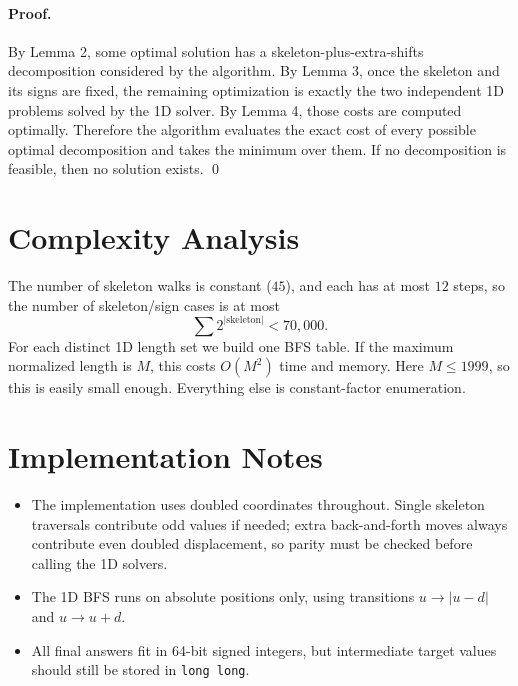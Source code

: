 \documentclass[11pt]{article}
\begin{document}
\paragraph{Proof.}
By Lemma 2, some optimal solution has a skeleton-plus-extra-shifts decomposition considered by the algorithm. By Lemma 3, once the skeleton and its signs are fixed, the remaining optimization is exactly the two independent 1D problems solved by the 1D solver. By Lemma 4, those costs are computed optimally. Therefore the algorithm evaluates the exact cost of every possible optimal decomposition and takes the minimum over them. If no decomposition is feasible, then no solution exists. \qed

\section*{Complexity Analysis}

The number of skeleton walks is constant ($45$), and each has at most $12$ steps, so the number of skeleton/sign cases is at most
\[
\sum 2^{|\text{skeleton}|} < 70{,}000.
\]
For each distinct 1D length set we build one BFS table. If the maximum normalized length is $M$, this costs $O(M^2)$ time and memory. Here $M \le 1999$, so this is easily small enough. Everything else is constant-factor enumeration.

\section*{Implementation Notes}

\begin{itemize}[leftmargin=*]
    \item The implementation uses doubled coordinates throughout. Single skeleton traversals contribute odd values if needed; extra back-and-forth moves always contribute even doubled displacement, so parity must be checked before calling the 1D solvers.
    \item The 1D BFS runs on absolute positions only, using transitions $u \to |u-d|$ and $u \to u+d$.
    \item All final answers fit in 64-bit signed integers, but intermediate target values should still be stored in \texttt{long long}.
\end{itemize}
\end{document}
